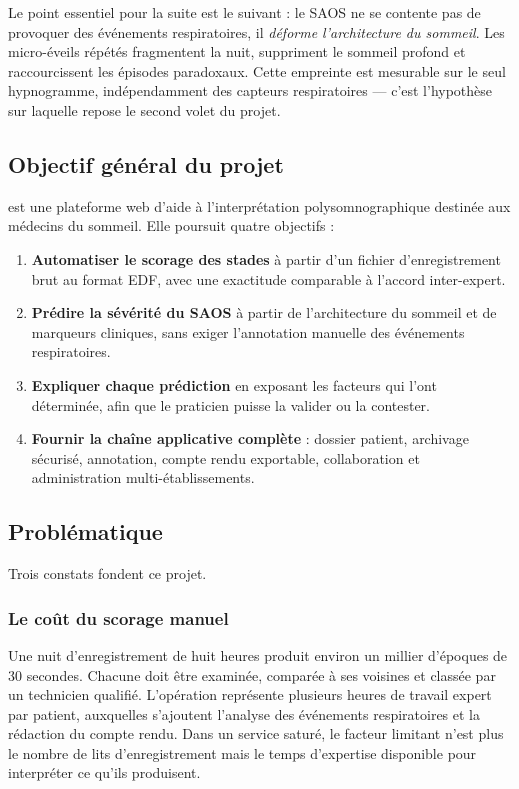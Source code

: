 Le point essentiel pour la suite est le suivant : le SAOS ne se contente pas de
provoquer des événements respiratoires, il \emph{déforme l'architecture du sommeil}.
Les micro-éveils répétés fragmentent la nuit, suppriment le sommeil profond et
raccourcissent les épisodes paradoxaux. Cette empreinte est mesurable sur le seul
hypnogramme, indépendamment des capteurs respiratoires --- c'est l'hypothèse sur
laquelle repose le second volet du projet.

\subsection{Objectif général du projet}

\hypnoria{} est une plateforme web d'aide à l'interprétation polysomnographique
destinée aux médecins du sommeil. Elle poursuit quatre objectifs :

\begin{enumerate}[itemsep=3pt,topsep=4pt]
  \item \textbf{Automatiser le scorage des stades} à partir d'un fichier
        d'enregistrement brut au format EDF, avec une exactitude comparable à l'accord
        inter-expert.
  \item \textbf{Prédire la sévérité du SAOS} à partir de l'architecture du sommeil et
        de marqueurs cliniques, sans exiger l'annotation manuelle des événements
        respiratoires.
  \item \textbf{Expliquer chaque prédiction} en exposant les facteurs qui l'ont
        déterminée, afin que le praticien puisse la valider ou la contester.
  \item \textbf{Fournir la chaîne applicative complète} : dossier patient, archivage
        sécurisé, annotation, compte rendu exportable, collaboration et administration
        multi-établissements.
\end{enumerate}

\subsection{Problématique}

Trois constats fondent ce projet.

\subsubsection{Le coût du scorage manuel}

Une nuit d'enregistrement de huit heures produit environ un millier d'époques de
30 secondes. Chacune doit être examinée, comparée à ses voisines et classée par un
technicien qualifié. L'opération représente plusieurs heures de travail expert par
patient, auxquelles s'ajoutent l'analyse des événements respiratoires et la rédaction du
compte rendu. Dans un service saturé, le facteur limitant n'est plus le nombre de lits
d'enregistrement mais le temps d'expertise disponible pour interpréter ce qu'ils
produisent.

